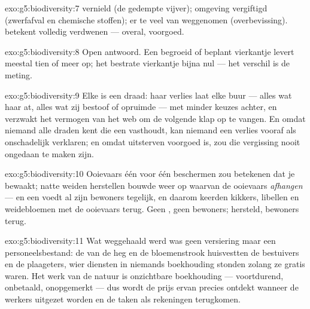 \begin{solution}{exo:g5:biodiversity:7}
 vernield (de gedempte vijver); omgeving vergiftigd
(zwerfafval en chemische stoffen); er te veel van weggenomen
(overbevissing).  betekent volledig verdwenen --- overal,
voorgoed.
\end{solution}

\begin{solution}{exo:g5:biodiversity:8}
Open antwoord. Een begroeid of beplant vierkantje levert meestal tien of
meer  op; het bestrate vierkantje bijna nul --- het verschil is
de meting.
\end{solution}

\begin{solution}{exo:g5:biodiversity:9}
Elke  is een draad: haar verlies laat elke buur --- alles wat haar
at, alles wat zij bestoof of opruimde --- met minder keuzes achter, en
verzwakt het vermogen van het web om de volgende klap op te vangen. En
omdat niemand alle draden kent die een  vasthoudt, kan niemand een
verlies vooraf als onschadelijk verklaren; en omdat uitsterven voorgoed
is, zou die vergissing nooit ongedaan te maken zijn.
\end{solution}

\begin{solution}{exo:g5:biodiversity:10}
Ooievaars één voor één beschermen zou betekenen dat je  bewaakt;
natte weiden herstellen bouwde weer op waarvan de ooievaars
\emph{afhangen} --- en een  voedt al zijn bewoners tegelijk,
en daarom keerden kikkers, libellen en weidebloemen met de ooievaars
terug. Geen , geen bewoners;  hersteld, bewoners terug.
\end{solution}

\begin{solution}{exo:g5:biodiversity:11}
Wat weggehaald werd was geen versiering maar een personeelsbestand: de
 van de heg en de bloemenstrook huisvestten de bestuivers en de
plaageters, wier diensten in niemands boekhouding stonden zolang ze
gratis waren. Het werk van de natuur is onzichtbare boekhouding ---
voortdurend, onbetaald, onopgemerkt --- dus wordt de prijs ervan precies
ontdekt wanneer de werkers uitgezet worden en de taken als rekeningen
terugkomen.
\end{solution}
